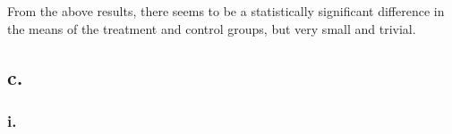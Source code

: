 \documentclass[
]{article}
\newenvironment{Shaded}{\begin{snugshade}}{\end{snugshade}}
\newcommand{\KeywordTok}[1]{\textcolor[rgb]{0.13,0.29,0.53}{\textbf{#1}}}
\newcommand{\NormalTok}[1]{#1}
\newcommand{\OperatorTok}[1]{\textcolor[rgb]{0.81,0.36,0.00}{\textbf{#1}}}
\newcommand{\StringTok}[1]{\textcolor[rgb]{0.31,0.60,0.02}{#1}}
\begin{document}
From the above results, there seems to be a statistically significant
difference in the means of the treatment and control groups, but very
small and trivial.

\hypertarget{c.}{%
\subsection{c.~}\label{c.}}

\hypertarget{i.}{%
\subsubsection{i.}\label{i.}}

\begin{Shaded}
\end{Shaded}
\end{document}
